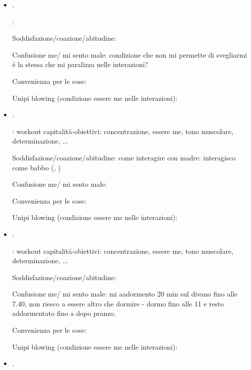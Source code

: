 \begin{itemize}
Confusione me/ mi sento male: non so perch\'e mi voglio svegliare; workout trazioni/punch bag alle 22: dopo cena non riesco a rimanere sveglio.

Convenienza per le cose:

Unipi blowing (condizione essere me nelle interazioni): 

\item {}.

:

Soddisfazione/coazione/abitudine:

Confusione me/ mi sento male: condizione che non mi permette di svegliarmi \'e la stessa che mi paralizza nelle interazioni? 

Convenienza per le cose:

Unipi blowing (condizione essere me nelle interazioni):

\item {}.

: workout capitalit\'a-obiettivi: concentrazione, essere me, tono muscolare, determinazione, ...

Soddisfazione/coazione/abitudine: come interagire con madre: interagisco come babbo (, )

Confusione me/ mi sento male: 

Convenienza per le cose:

Unipi blowing (condizione essere me nelle interazioni):

\item {}.

: workout capitalit\'a-obiettivi: concentrazione, essere me, tono muscolare, determinazione, ...

Soddisfazione/coazione/abitudine:

Confusione me/ mi sento male: mi aadormento 20 min sul divano fino alle 7.40, non riesco a essere altro che dormire - dormo fino alle 11 e resto addormentato fino a dopo pranzo.

Convenienza per le cose:

Unipi blowing (condizione essere me nelle interazioni):

\item {}.


\end{itemize}
